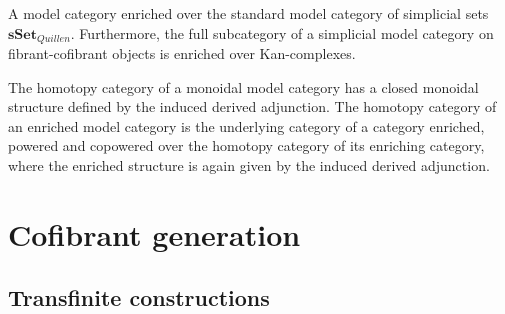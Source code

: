     \begin{example}\label{model:simplicial_model_category}
        A model category enriched over the standard model category of simplicial sets $\mathbf{sSet}_{Quillen}$. Furthermore, the full subcategory of a simplicial model category on fibrant-cofibrant objects is enriched over Kan-complexes.
    \end{example}

    \begin{property}
        The homotopy category of a monoidal model category has a closed monoidal structure defined by the induced derived adjunction. The homotopy category of an enriched model category is the underlying category of a category enriched, powered and copowered over the homotopy category of its enriching category, where the enriched structure is again given by the induced derived adjunction.
    \end{property}

\section{Cofibrant generation}
\subsection{Transfinite constructions}

